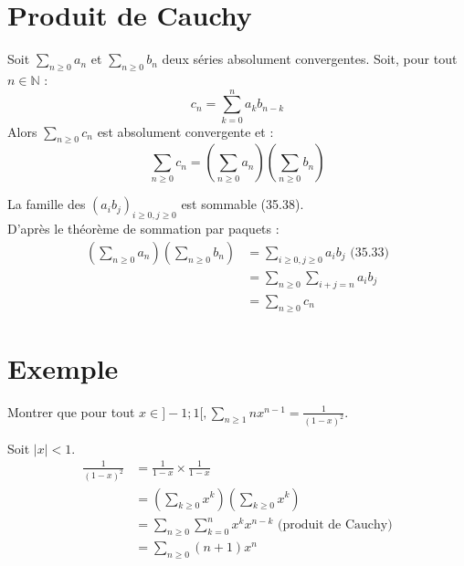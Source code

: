 \documentclass[../main.tex]{subfiles}
\begin{document}
\section{Produit de Cauchy}
\begin{tcolorbox}[title=Théorème 35.38, title filled=false, colframe=orange, colback=orange!10!white]
    Soit $\sum_{n \geq 0} a_n$ et $\sum_{n \geq 0} b_n$ deux séries absolument convergentes. Soit, pour tout $n \in \mathbb{N}$ :
    $$c_n=\sum_{k=0}^n a_k b_{n-k}$$
    Alors $\sum_{n \geq 0} c_n$ est absolument convergente et :
    $$\sum_{n \geq 0} c_n=\left(\sum_{n \geq 0} a_n\right)\left(\sum_{n \geq 0} b_n\right)$$
\end{tcolorbox}

\noindent La famille des $(a_i b_j)_{i\geq 0, j\geq 0}$ est sommable (35.38). \\
D'après le théorème de sommation par paquets : 
\begin{align*}
    \left( \sum_{n\geq 0} a_n \right) \left( \sum_{n\geq 0} b_n \right) &= \sum_{i\geq 0, j\geq 0} a_i b_j \text{ (35.33)} \\
    &= \sum_{n\geq 0} \sum_{i+j = n} a_i b_j \\
    &= \sum_{n\geq 0} c_n
\end{align*}

\section{Exemple}
\begin{tcolorbox}[title=Exemple 35.39, title filled=false, colframe=darkgreen, colback=darkgreen!10!white]
    Montrer que pour tout $x\in ]-1; 1[, \sum\limits_{n\geq 1} nx^{n-1} = \frac{1}{(1-x)^2}$.
\end{tcolorbox}

\noindent Soit $|x| < 1$. 
\begin{align*}
    \frac{1}{(1 - x)^2} &= \frac{1}{1 - x} \times \frac{1}{1 - x} \\
    &= \left( \sum_{k\geq 0} x^k \right) \left( \sum_{k\geq 0} x^k \right) \\
    &= \sum_{n\geq 0} \sum_{k=0}^{n} x^k x^{n-k} \text{ (produit de Cauchy)} \\
    &= \sum_{n\geq 0} (n+1) x^n
\end{align*}
\end{document}
